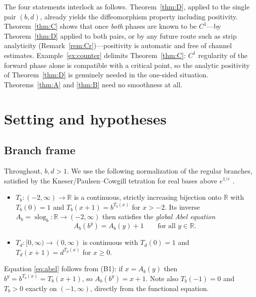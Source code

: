 \documentclass[11pt]{article}
\theoremstyle{definition}
\theoremstyle{remark}
\newcommand{\R}{\mathbb{R}}
\newcommand{\Ab}{A_{b}}
\newcommand{\Tb}{T_{b}}
\newcommand{\Td}{T_{d}}
\DeclareMathOperator{\slog}{slog}
\begin{document}
The four statements interlock as follows. Theorem~\ref{thm:D}, applied to
the single pair $(b,d)$, already yields the diffeomorphism property
including positivity. Theorem~\ref{thm:C} shows that once \emph{both}
phases are known to be $C^{1}$---by Theorem~\ref{thm:D} applied to both
pairs, or by any future route such as strip analyticity
(Remark~\ref{rem:Cr})---positivity is automatic and free of channel
estimates. Example~\ref{ex:counter} delimits Theorem~\ref{thm:C}:
$C^{1}$ regularity of the forward phase alone is compatible with a
critical point, so the analytic positivity of Theorem~\ref{thm:D} is
genuinely needed in the one-sided situation. Theorems~\ref{thm:A} and
\ref{thm:B} need no smoothness at all.

\section{Setting and hypotheses}\label{sec:setting}

\subsection{Branch frame}
Throughout, $b,d>1$. We use the following normalization of the regular
branches, satisfied by the Kneser/Paulsen--Cowgill tetration for real
bases above $e^{1/e}$ \cite{Kneser,PC}.

\begin{itemize}
\item[\textup{(B1)}] $\Tb:(-2,\infty)\to\R$ is a continuous, strictly
increasing bijection onto $\R$ with $\Tb(0)=1$ and
$\Tb(x+1)=b^{\Tb(x)}$ for $x>-2$. Its inverse
$\Ab=\slog_b:\R\to(-2,\infty)$ then satisfies the \emph{global Abel
equation}
\begin{equation}\label{eq:abel}
\Ab(b^{y})=\Ab(y)+1\qquad\text{for all }y\in\R .
\end{equation}
\item[\textup{(B2)}] $\Td:[0,\infty)\to(0,\infty)$ is continuous with
$\Td(0)=1$ and $\Td(x+1)=d^{\Td(x)}$ for $x\ge 0$.
\end{itemize}

Equation \eqref{eq:abel} follows from (B1): if $x=\Ab(y)$ then
$b^{y}=b^{\Tb(x)}=\Tb(x+1)$, so $\Ab(b^{y})=x+1$. Note also
$\Tb(-1)=0$ and $\Tb>0$ exactly on $(-1,\infty)$, directly from the
functional equation.
\end{document}
